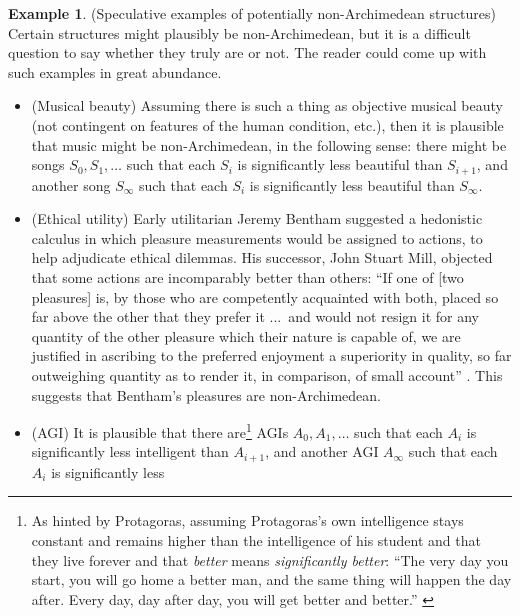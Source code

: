 \documentclass[reqno]{article}
\theoremstyle{definition}
\newtheorem{example}[theorem]{Example}
\begin{document}
\begin{example}
\label{speculativeexamples}
    (Speculative examples of potentially non-Archimedean structures)
    Certain structures might plausibly be non-Archimedean, but it is a difficult
    question to say whether they truly are or not. The reader could come up with
    such examples in great abundance.
    \begin{itemize}
        \item
        (Musical beauty)
        Assuming there is such a thing as objective
        musical beauty (not contingent on features of the human condition, etc.),
        then it is plausible that music might be non-Archimedean, in the following
        sense: there might be songs $S_0,S_1,\ldots$ such that each $S_i$
        is significantly less beautiful than $S_{i+1}$, and another song
        $S_\infty$ such that each $S_i$ is significantly less beautiful than $S_\infty$.
        \item
        (Ethical utility)
        Early utilitarian Jeremy Bentham suggested a hedonistic
        calculus in which pleasure measurements would be assigned to
        actions, to help adjudicate ethical dilemmas.
        His successor, John Stuart Mill, objected that some actions are incomparably
        better than others: ``If one of [two pleasures] is, by those
        who are competently acquainted with both, placed so far above the other that
        they prefer it ...\ and would not resign it for any quantity of the other
        pleasure which their nature is capable of, we are justified in ascribing to
        the preferred enjoyment a superiority in quality, so far outweighing quantity
        as to render it, in comparison, of small account'' \cite{mill}.
        This suggests that Bentham's pleasures are non-Archimedean.
        \item
        (AGI)
        It is plausible that there
        are\footnote{As hinted by Protagoras, assuming Protagoras's own intelligence
        stays constant and remains higher than the intelligence of his student
        and that they live forever and that \emph{better} means \emph{significantly
        better}:
        ``The very day you start, you will go home a better man, and the same thing
        will happen the day after. Every day, day after day, you will get better
        and better.'' \cite{protagoras}} AGIs $A_0,A_1,\ldots$ such that
        each $A_{i}$ is significantly less
        intelligent than $A_{i+1}$, and another AGI $A_\infty$ such that each $A_i$
        is significantly less

\end{itemize}
\end{example}
\end{document}
